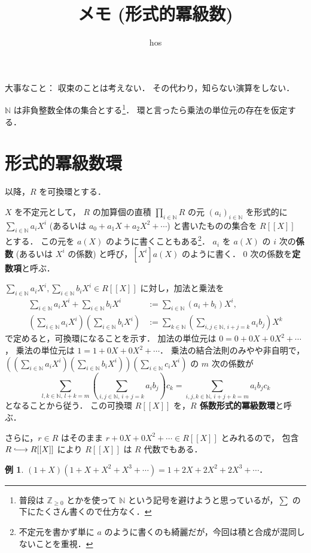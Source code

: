 \documentclass{jsarticle}
\title{メモ (形式的冪級数)}
\author{hos}
\newcommand{\N}{\mathbb{N}}
\newcommand{\Z}{\mathbb{Z}}
\theoremstyle{definition}
\newtheorem*{Exm}{例}
\newenvironment{exm}{\begin{leftbar}\begin{Exm}}{\end{Exm}\end{leftbar}}
\begin{document}
\maketitle

大事なこと：
収束のことは考えない．
その代わり，知らない演算をしない．

$\N$ は非負整数全体の集合とする\footnote{普段は $\Z_{\ge 0}$ とかを使って $\N$ という記号を避けようと思っているが，$\sum$ の下にたくさん書くので仕方なく．}．
環と言ったら乗法の単位元の存在を仮定する．

\section{形式的冪級数環}
以降，$R$ を可換環とする．

$X$ を不定元として，
$R$ の加算個の直積 $\prod_{i\in\N} R$ の元 $(a_i)_{i\in\N}$ を形式的に
$\sum_{i\in\N} a_i X^i$ (あるいは $a_0 + a_1 X + a_2 X^2 + \cdots$) と書いたものの集合を $R[[X]]$ とする．
この元を $a(X)$ のように書くこともある\footnote{不定元を書かず単に $a$ のように書くのも綺麗だが，今回は積と合成が混同しないことを重視．}．
$a_i$ を $a(X)$ の $i$ 次の\textbf{係数} (あるいは $X^i$ の係数) と呼び，$[X^i] a(X)$ のように書く．
$0$ 次の係数を\textbf{定数項}と呼ぶ．

$\sum_{i\in\N} a_i X^i, \sum_{i\in\N} b_iX^i \in R[[X]]$ に対し，加法と乗法を
\begin{align*}
  \sum_{i\in\N} a_i X^i + \sum_{i\in\N} b_i X^i &:= \sum_{i\in\N} (a_i + b_i) X^i, \\
  \left(\sum_{i\in\N} a_i X^i\right) \left(\sum_{i\in\N} b_i X^i\right) &:= \sum_{k\in\N} \left(\sum_{i,j\in\N,\,i+j=k} a_i b_j\right) X^k
\end{align*}
で定めると，可換環になることを示す．
加法の単位元は $0 = 0 + 0 X + 0 X^2 + \cdots$，
乗法の単位元は $1 = 1 + 0 X + 0 X^2 + \cdots$．
乗法の結合法則のみやや非自明で，
$\left(\left(\sum_{i\in\N} a_i X^i\right) \left(\sum_{i\in\N} b_i X^i\right)\right) \left(\sum_{i\in\N} c_i X^i\right)$ の
$m$ 次の係数が
\[
  \sum_{l,k\in\N,\,l+k=m} \left(\sum_{i,j\in\N,\,i+j=k} a_i b_j\right) c_k = \sum_{i,j,k\in\N,\,i+j+k=m} a_i b_j c_k
\]
となることから従う．
この可換環 $R[[X]]$ を，\textbf{$R$ 係数形式的冪級数環}と呼ぶ．

さらに，$r \in R$ はそのまま $r + 0 X + 0 X^2 + \cdots \in R[[X]]$ とみれるので，
包含 $R \lhook\joinrel\longrightarrow R[[X]]$ により $R[[X]]$ は $R$ 代数でもある．

\begin{exm}
  $(1 + X) (1 + X + X^2 + X^3 + \cdots) = 1 + 2 X + 2 X^2 + 2 X^3 + \cdots$．
\end{exm}
\end{document}
